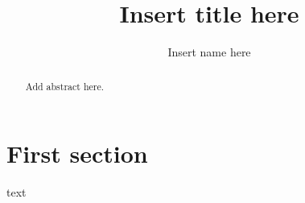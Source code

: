 \documentclass[12pt]{article}		%
\title{Insert title here}
\author{Insert name here}
\date{}
\begin{document}
\maketitle

\setlength{\parindent}{0in} %

\begin{abstract}
	
	Add abstract here.

\end{abstract}

\section{First section} 

text


\end{document}
